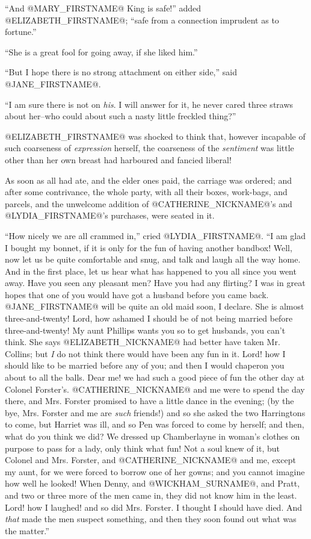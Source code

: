 ``And @MARY_FIRSTNAME@ King is safe!'' added @ELIZABETH_FIRSTNAME@; ``safe from a connection
imprudent as to fortune.''

``She is a great fool for going away, if she liked him.''

``But I hope there is no strong attachment on either side,'' said @JANE_FIRSTNAME@.

``I am sure there is not on \textit{his}. I will answer for it, he never cared
three straws about her--who could about such a nasty little freckled
thing?''

@ELIZABETH_FIRSTNAME@ was shocked to think that, however incapable of such
coarseness of \textit{expression} herself, the coarseness of the \textit{sentiment}
was little other than her own breast had harboured and fancied liberal!

As soon as all had ate, and the elder ones paid, the carriage was
ordered; and after some contrivance, the whole party, with all their
boxes, work-bags, and parcels, and the unwelcome addition of @CATHERINE_NICKNAME@'s and
@LYDIA_FIRSTNAME@'s purchases, were seated in it.

``How nicely we are all crammed in,'' cried @LYDIA_FIRSTNAME@. ``I am glad I bought my
bonnet, if it is only for the fun of having another bandbox! Well, now
let us be quite comfortable and snug, and talk and laugh all the way
home. And in the first place, let us hear what has happened to you all
since you went away. Have you seen any pleasant men? Have you had any
flirting? I was in great hopes that one of you would have got a husband
before you came back. @JANE_FIRSTNAME@ will be quite an old maid soon, I declare.
She is almost three-and-twenty! Lord, how ashamed I should be of not
being married before three-and-twenty! My aunt Phillips wants you so to
get husbands, you can't think. She says @ELIZABETH_NICKNAME@ had better have taken Mr.
Collins; but \textit{I} do not think there would have been any fun in it. Lord!
how I should like to be married before any of you; and then I would
chaperon you about to all the balls. Dear me! we had such a good piece
of fun the other day at Colonel Forster's. @CATHERINE_NICKNAME@ and me were to spend
the day there, and Mrs. Forster promised to have a little dance in the
evening; (by the bye, Mrs. Forster and me are \textit{such} friends!) and so
she asked the two Harringtons to come, but Harriet was ill, and so Pen
was forced to come by herself; and then, what do you think we did? We
dressed up Chamberlayne in woman's clothes on purpose to pass for a
lady, only think what fun! Not a soul knew of it, but Colonel and Mrs.
Forster, and @CATHERINE_NICKNAME@ and me, except my aunt, for we were forced to borrow
one of her gowns; and you cannot imagine how well he looked! When Denny,
and @WICKHAM_SURNAME@, and Pratt, and two or three more of the men came in, they
did not know him in the least. Lord! how I laughed! and so did Mrs.
Forster. I thought I should have died. And \textit{that} made the men suspect
something, and then they soon found out what was the matter.''

